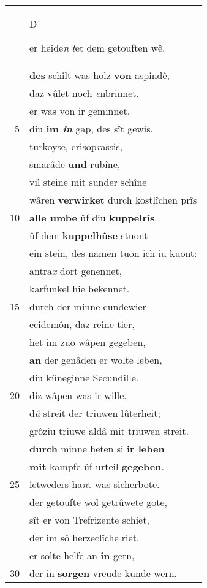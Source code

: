 \documentclass[8pt,a4paper,notitlepage]{article}
\begin{document}
\begin{table}[ht]
\begin{minipage}[t]{0.5\linewidth}
\begin{tabular}{rl}
 & \begin{large}D\end{large}er heide\textit{n} \textit{t}et dem getouften wê.\\ 
 & \textbf{des} schilt was holz \textbf{von} aspindê,\\ 
 & daz vûlet noch \textit{e}nbrinnet.\\ 
 & er was von ir geminnet,\\ 
5 & diu \textbf{im \textit{in}} gap, des sît gewis.\\ 
 & turkoyse, crisop\textit{r}assis,\\ 
 & smarâde \textbf{und} rubîne,\\ 
 & vil steine mit sunder schîne\\ 
 & wâren \textbf{verwirket} durch kostlîchen prîs\\ 
10 & \textbf{alle umbe} ûf diu \textbf{kuppelrîs}.\\ 
 & ûf dem \textbf{kuppelhûse} stuont\\ 
 & ein stein, des namen tuon ich iu kuont:\\ 
 & antra\textit{x} dort genennet,\\ 
 & karfunkel hie bekennet.\\ 
15 & durch der minne cundewier\\ 
 & ecidemôn, daz reine tier,\\ 
 & het im zuo wâpen gegeben,\\ 
 & \textbf{an} der genâden er wolte leben,\\ 
 & diu küneginne Secundille.\\ 
20 & diz wâpen was ir wille.\\ 
 & d\textit{â} streit der triuwen lûterheit;\\ 
 & grôziu triuwe aldâ mit triuwen streit.\\ 
 & \textbf{durch} minne heten si \textbf{ir leben}\\ 
 & \textbf{mit} kampfe ûf urteil \textbf{gegeben}.\\ 
25 & ietweders ha\textit{n}t was sicherbote.\\ 
 & der getoufte wol getrûwete gote,\\ 
 & sît er von Trefrizente schiet,\\ 
 & der im sô herzeclîche riet,\\ 
 & er solte helfe an \textbf{in} gern,\\ 
30 & der in \textbf{sorgen} vreude kunde wern.\\ 
\end{tabular}

\end{minipage}
\end{table}
\end{document}
